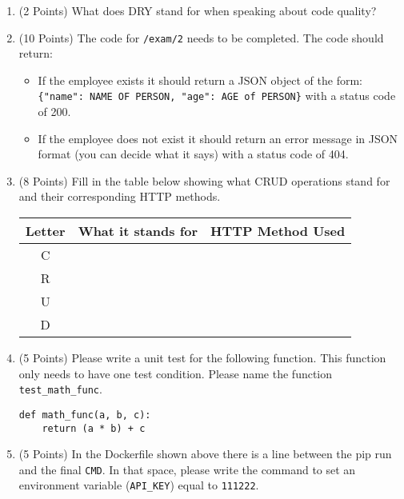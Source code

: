 \documentclass[11pt]{article}
\begin{document}
\begin{enumerate}
\item (2 Points) What does DRY stand for when speaking about code quality?


\vspace{3cm}

\item (10 Points) The code for \texttt{/exam/2} needs to be completed. The code should return:
\begin{itemize}
	\item If the employee exists it should return a JSON object of the form: \\ \texttt{\{"name": NAME OF PERSON, "age": AGE of PERSON\}} with a status code of 200.
	\item If the employee does not exist it should return an error message in JSON format (you can decide what it says) with a status code of 404.
\end{itemize}


\vspace{5cm} 


\newpage
\item (8 Points) Fill in the table below showing what CRUD operations stand for and their corresponding HTTP methods. 


\begin{center}
	

\begin{tabular}{|c|p{8cm}|p{6cm}|}
\hline 
Letter & \centering What it stands for & HTTP Method Used \\
\hline
C & & \\[.75cm]
\hline
R & & \\[.75cm]
\hline
U & & \\[.75cm]
\hline
D & & \\[.75cm]
\hline
\end{tabular}

\end{center}



\item (5 Points) Please write a unit test for the following function. This function only needs to have one test condition. Please name the function \texttt{test\_math\_func}.


\begin{verbatim}
def math_func(a, b, c):
    return (a * b) + c
\end{verbatim}


\vspace{5cm}

\item (5 Points) In the Dockerfile shown above there is a line between the pip run  and the final \texttt{CMD}. In that space, please write the command to set an environment variable (\texttt{API\_KEY}) equal to \texttt{111222}.



\end{enumerate}
\end{document}
